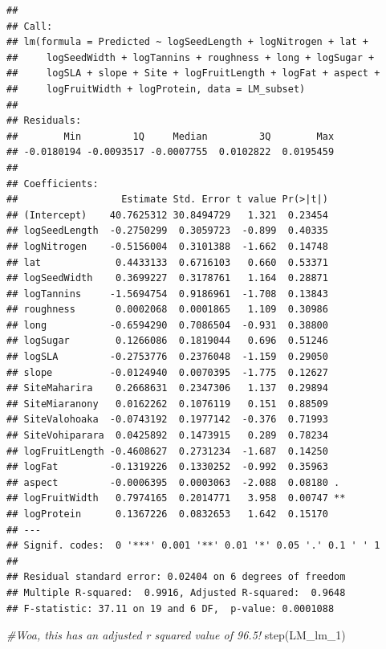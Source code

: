 \documentclass[
  12pt,
]{article}
\newenvironment{Shaded}{\begin{snugshade}}{\end{snugshade}}
\newcommand{\CommentTok}[1]{\textcolor[rgb]{0.56,0.35,0.01}{\textit{#1}}}
\newcommand{\FunctionTok}[1]{\textcolor[rgb]{0.00,0.00,0.00}{#1}}
\newcommand{\NormalTok}[1]{#1}
\begin{document}
\begin{verbatim}
## 
## Call:
## lm(formula = Predicted ~ logSeedLength + logNitrogen + lat + 
##     logSeedWidth + logTannins + roughness + long + logSugar + 
##     logSLA + slope + Site + logFruitLength + logFat + aspect + 
##     logFruitWidth + logProtein, data = LM_subset)
## 
## Residuals:
##        Min         1Q     Median         3Q        Max 
## -0.0180194 -0.0093517 -0.0007755  0.0102822  0.0195459 
## 
## Coefficients:
##                  Estimate Std. Error t value Pr(>|t|)   
## (Intercept)    40.7625312 30.8494729   1.321  0.23454   
## logSeedLength  -0.2750299  0.3059723  -0.899  0.40335   
## logNitrogen    -0.5156004  0.3101388  -1.662  0.14748   
## lat             0.4433133  0.6716103   0.660  0.53371   
## logSeedWidth    0.3699227  0.3178761   1.164  0.28871   
## logTannins     -1.5694754  0.9186961  -1.708  0.13843   
## roughness       0.0002068  0.0001865   1.109  0.30986   
## long           -0.6594290  0.7086504  -0.931  0.38800   
## logSugar        0.1266086  0.1819044   0.696  0.51246   
## logSLA         -0.2753776  0.2376048  -1.159  0.29050   
## slope          -0.0124940  0.0070395  -1.775  0.12627   
## SiteMaharira    0.2668631  0.2347306   1.137  0.29894   
## SiteMiaranony   0.0162262  0.1076119   0.151  0.88509   
## SiteValohoaka  -0.0743192  0.1977142  -0.376  0.71993   
## SiteVohiparara  0.0425892  0.1473915   0.289  0.78234   
## logFruitLength -0.4608627  0.2731234  -1.687  0.14250   
## logFat         -0.1319226  0.1330252  -0.992  0.35963   
## aspect         -0.0006395  0.0003063  -2.088  0.08180 . 
## logFruitWidth   0.7974165  0.2014771   3.958  0.00747 **
## logProtein      0.1367226  0.0832653   1.642  0.15170   
## ---
## Signif. codes:  0 '***' 0.001 '**' 0.01 '*' 0.05 '.' 0.1 ' ' 1
## 
## Residual standard error: 0.02404 on 6 degrees of freedom
## Multiple R-squared:  0.9916, Adjusted R-squared:  0.9648 
## F-statistic: 37.11 on 19 and 6 DF,  p-value: 0.0001088
\end{verbatim}

\begin{Shaded}
\begin{Highlighting}[]
\CommentTok{\#Woa, this has an adjusted r squared value of 96.5!}
\FunctionTok{step}\NormalTok{(LM\_lm\_1)}
\end{Highlighting}
\end{Shaded}
\end{document}
